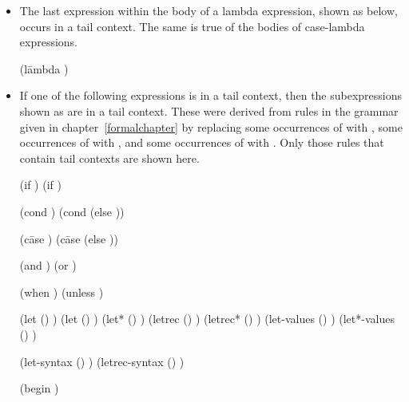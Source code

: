 \begin{itemize}
\item The last expression within the body of a lambda expression,
  shown as  below, occurs in a tail context.
  The same is true of the bodies of {\cf case-lambda} expressions.
\begin{grammar}%
(l\=ambda 
  \>  )
\end{grammar}%

\item If one of the following expressions is in a tail context,
then the subexpressions shown as  are in a tail context.
These were derived from rules in the grammar given in
chapter~\ref{formalchapter} by replacing some occurrences of 
with ,  some occurrences of 
with ,  and some occurrences of 
with .  Only those rules that contain tail contexts
are shown here.

\begin{grammar}%
(if   )
(if  )

(cond )
(cond  (else ))

(c\=ase 
  \>)
(c\=ase 
  \>
  \>(else ))

(and  )
(or  )

(when  )
(unless  )

(let () )
(let  () )
(let* () )
(letrec () )
(letrec* () )
(let-values () )
(let*-values () )

(let-syntax () )
(letrec-syntax () )

(begin )


\end{grammar}
\end{itemize}
